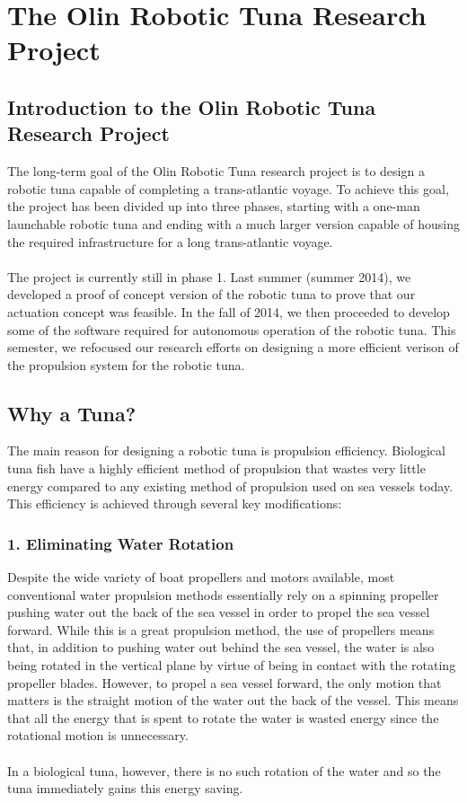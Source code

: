\renewcommand\thesection{\arabic{section}}
\section{The Olin Robotic Tuna Research Project}

\subsection{Introduction to the Olin Robotic Tuna Research Project}
The long-term goal of the Olin Robotic Tuna research project is to design a robotic tuna capable of completing a trans-atlantic voyage. To achieve this goal, the project has been divided up into three phases, starting with a one-man launchable robotic tuna and ending with a much larger version capable of housing the required infrastructure for a long trans-atlantic voyage. \\ \\
%
The project is currently still in phase 1. Last summer (summer 2014), we developed a proof of concept version of the robotic tuna to prove that our actuation concept was feasible. In the fall of 2014, we then proceeded to develop some of the software required for autonomous operation of the robotic tuna. This semester, we refocused our research efforts on designing a more efficient verison of the propulsion system for the robotic tuna.
%
\subsection{Why a Tuna?}

The main reason for designing a robotic tuna is propulsion efficiency. Biological tuna fish have a highly efficient method of propulsion that wastes very little energy compared to any existing method of propulsion used on sea vessels today. This efficiency is achieved through several key modifications:
%
\subsubsection{1. Eliminating Water Rotation}
%
Despite the wide variety of boat propellers and motors available, most conventional water propulsion methods essentially rely on a spinning propeller pushing water out the back of the sea vessel in order to propel the sea vessel forward. While this is a great propulsion method, the use of propellers means that, in addition to pushing water out behind the sea vessel, the water is also being rotated in the vertical plane by virtue of being in contact with the rotating propeller blades. However, to propel a sea vessel forward, the only motion that matters is the straight motion of the water out the back of the vessel. This means that all the energy that is spent to rotate the water is wasted energy since the rotational motion is unnecessary. \\ \\
%
In a biological tuna, however, there is no such rotation of the water and so the tuna immediately gains this energy saving.
%
